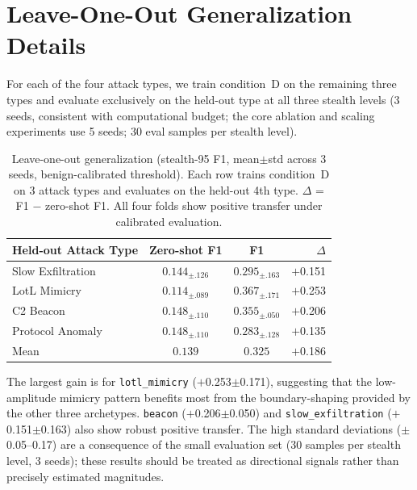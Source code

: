 \section{Leave-One-Out Generalization Details}
\label{app:loo_detail}

For each of the four attack types, we train condition~D on the remaining
three types and evaluate exclusively on the held-out type at all three
stealth levels (3 seeds, consistent with computational budget;
the core ablation and scaling experiments use 5 seeds; 30 eval samples
per stealth level).

\begin{table}[h]
\centering
\caption{
  Leave-one-out generalization (stealth-95 F1, mean$\pm$std across 3 seeds,
  benign-calibrated threshold).
  Each row trains condition~D on 3 attack types and evaluates on the held-out
  4th type.  $\Delta$ = \ours{} F1 $-$ zero-shot F1.
  All four folds show positive transfer under calibrated evaluation.
}
\label{tab:loo}
\begin{tabular}{lccr}
\toprule
Held-out Attack Type & Zero-shot F1 & \ours{} F1 & $\Delta$ \\
\midrule
Slow Exfiltration  & $0.144_{\pm.126}$ & $0.295_{\pm.163}$ & $+$0.151 \\
LotL Mimicry       & $0.114_{\pm.089}$ & $0.367_{\pm.171}$ & $+$0.253 \\
C2 Beacon          & $0.148_{\pm.110}$ & $0.355_{\pm.050}$ & $+$0.206 \\
Protocol Anomaly   & $0.148_{\pm.110}$ & $0.283_{\pm.128}$ & $+$0.135 \\
\midrule
Mean               & $0.139$ & $0.325$ & $+$0.186 \\
\bottomrule
\end{tabular}
\end{table}

The largest gain is for \texttt{lotl\_mimicry} ($+$0.253$\pm$0.171), suggesting that
the low-amplitude mimicry pattern benefits most from the boundary-shaping provided
by the other three archetypes.
\texttt{beacon} ($+$0.206$\pm$0.050) and \texttt{slow\_exfiltration} ($+$0.151$\pm$0.163)
also show robust positive transfer.
The high standard deviations ($\pm$0.05--0.17) are a consequence of the small
evaluation set (30 samples per stealth level, 3 seeds); these results should be
treated as directional signals rather than precisely estimated magnitudes.

